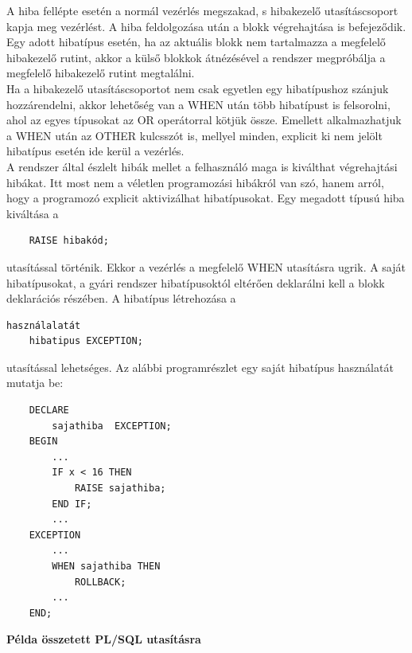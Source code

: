 \documentclass[tikz,12pt,margin=0px]{article}
\begin{document}
    \noindent A hiba fellépte esetén a normál vezérlés megszakad, s hibakezelő utasításcsoport kapja meg vezérlést. A hiba feldolgozása után a blokk végrehajtása is befejeződik. Egy adott hibatípus esetén, ha az aktuális blokk nem tartalmazza a megfelelő hibakezelő rutint, akkor a külső blokkok átnézésével a rendszer megpróbálja a megfelelő hibakezelő rutint megtalálni.\\

    \noindent Ha a hibakezelő utasításcsoportot nem csak egyetlen egy hibatípushoz szánjuk hozzárendelni, akkor lehetőség van a WHEN után több hibatípust is felsorolni, ahol az egyes típusokat az OR operátorral kötjük össze. Emellett alkalmazhatjuk a WHEN után az OTHER kulcsszót is, mellyel minden, explicit ki nem jelölt hibatípus esetén ide kerül a vezérlés.\\

    \noindent A rendszer által észlelt hibák mellet a felhasználó maga is kiválthat végrehajtási hibákat. Itt most nem a véletlen programozási hibákról van szó, hanem arról, hogy a programozó explicit aktivizálhat hibatípusokat. Egy megadott típusú hiba kiváltása a
    \begin{verbatim}
    RAISE hibakód;
    \end{verbatim}
    utasítással történik. Ekkor a vezérlés a megfelelő WHEN utasításra ugrik. A saját hibatípusokat, a gyári rendszer hibatípusoktól eltérően deklarálni kell a blokk deklarációs részében. A hibatípus létrehozása a
    \begin{verbatim}használalatát
    hibatipus EXCEPTION;
    \end{verbatim}
    utasítással lehetséges. Az alábbi programrészlet egy saját hibatípus használatát mutatja be:
    {\small
    \begin{verbatim}
    DECLARE
    	sajathiba  EXCEPTION;
    BEGIN
    	...
    	IF x < 16 THEN
    		RAISE sajathiba;
    	END IF;
    	...
    EXCEPTION
    	...
    	WHEN sajathiba THEN
    		ROLLBACK;
    	...
    END;
    \end{verbatim}
    }
\newpage
    \noindent \textbf{Példa összetett PL/SQL utasításra\\}
\end{document}
